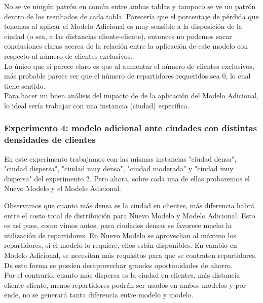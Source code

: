 \documentclass{article}
\begin{document}
No se ve ningún patrón en común entre ambas tablas y tampoco se ve un patrón dentro de los resultados de cada tabla. Parecería que el porcentaje de pérdida que tenemos al aplicar el Modelo Adicional es muy sensible a la disposición de la ciudad (o sea, a las distancias cliente-cliente), entonces no podemos sacar conclusiones claras acerca de la relación entre la aplicación de este modelo con respecto al número de clientes exclusivos. \\
Lo único que sí parece claro es que al aumentar el número de clientes exclusivos, más probable parece ser que el número de repartidores requeridos sea 0, lo cual tiene sentido. \\
Para hacer un buen análisis del impacto de de la aplicación del Modelo Adicional, lo ideal sería trabajar con una instancia (ciudad) específica.

\subsubsection{Experimento 4: modelo adicional ante ciudades con distintas densidades de clientes}

En este experimento trabajamos con las mismas instancias "ciudad densa", "ciudad dispersa", "ciudad muy densa", "ciudad moderada" y "ciudad muy dispersa" del experimento 2. Pero ahora, sobre cada una de ellas probaremos el Nuevo Modelo y el Modelo Adicional. 

\begin{table}[H]
\centering
{}
\caption{Comparación de costos entre metodologías para distintas densidades de clientes por $km^{2}$}
\end{table}

Observamos que cuanto más densa es la ciudad en clientes, más diferencia habrá entre el costo total de distribución para Nuevo Modelo y Modelo Adicional. Esto es así pues, como vimos antes, para ciudades densas se favorece mucho la utilización de repartidores. En Nuevo Modelo se aprovechan al máximo los repartidores, si el modelo lo requiere, ellos están disponibles. En cambio en Modelo Adicional, se necesitan más requisitos para que se contraten repartidores. De esta forma se pueden desaprovechar grandes oportunidades de ahorro. \\
Por el contrario, cuanto más dispersa es la ciudad en clientes, más distancia cliente-cliente, menos repartidores podrán ser usados en ambos modelos y por ende, no se generará tanta diferencia entre modelo y modelo. 
\end{document}
